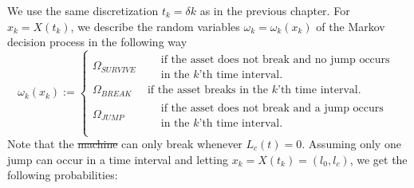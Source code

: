 \documentclass[a4paper]{thesis}
\theoremstyle{definition}
\providecommand{\DIFaddtex}[1]{{\protect\color{blue}\uwave{#1}}} %
\providecommand{\DIFdeltex}[1]{{\protect\color{red}\sout{#1}}}                      %
\providecommand{\DIFaddbegin}{} %
\providecommand{\DIFaddend}{} %
\providecommand{\DIFdelbegin}{} %
\providecommand{\DIFdelend}{} %
\providecommand{\DIFadd}[1]{\texorpdfstring{\DIFaddtex{#1}}{#1}} %
\providecommand{\DIFdel}[1]{\texorpdfstring{\DIFdeltex{#1}}{}} %
\newcommand{\DIFscaledelfig}{0.5}
\newlength{\DIFdelgraphicswidth} %
\newlength{\DIFdelgraphicsheight} %
\newcommand{\DIFaddincludegraphics}[2][]{{\color{blue}\fbox{\DIFOincludegraphics[#1]{#2}}}} %
\newcommand{\DIFdelincludegraphics}[2][]{%
	\sbox{\DIFdelgraphicsbox}{\DIFOincludegraphics[#1]{#2}}%
	\settoboxwidth{\DIFdelgraphicswidth}{\DIFdelgraphicsbox} %
	\settoboxtotalheight{\DIFdelgraphicsheight}{\DIFdelgraphicsbox} %
	\scalebox{\DIFscaledelfig}{%
		\parbox[b]{\DIFdelgraphicswidth}{\usebox{\DIFdelgraphicsbox}\\[-\baselineskip] \rule{\DIFdelgraphicswidth}{0em}}\llap{\resizebox{\DIFdelgraphicswidth}{\DIFdelgraphicsheight}{%
				\setlength{\unitlength}{\DIFdelgraphicswidth}%
				\begin{picture}(1,1)%
				\thicklines\linethickness{2pt} %
				{\color[rgb]{1,0,0}\put(0,0){\framebox(1,1){}}}%
				{\color[rgb]{1,0,0}\put(0,0){\line( 1,1){1}}}%
				{\color[rgb]{1,0,0}\put(0,1){\line(1,-1){1}}}%
				\end{picture}%
			}\hspace*{3pt}}} %
} %
\DeclareRobustCommand{\DIFaddbegin}{\DIFOaddbegin \let\includegraphics\DIFaddincludegraphics} %
\DeclareRobustCommand{\DIFaddend}{\DIFOaddend \let\includegraphics\DIFOincludegraphics} %
\DeclareRobustCommand{\DIFdelbegin}{\DIFOdelbegin \let\includegraphics\DIFdelincludegraphics} %
\DeclareRobustCommand{\DIFdelend}{\DIFOaddend \let\includegraphics\DIFOincludegraphics} %
\begin{document}
	We use the same discretization $t_k=\delta k$ as in the previous chapter.
	For $x_k=X(t_k)$, we describe the random variables $\omega_k=\omega_k(x_k)$ of the Markov decision process in the following way
	\[
	\omega_k(x_k):=\DIFdelbegin %
	\DIFdelend \DIFaddbegin \begin{cases}
	\Omega_{SURVIVE}&\ \begin{split}&\text{if the asset does not break and no jump occurs}\\
	&\text{in the $k$'th time interval.}\end{split}\\
	\Omega_{BREAK}&\ \text{if the asset breaks in the $k$'th time interval.}\\
	\Omega_{JUMP}&\ \begin{split}&\text{if the asset does not break and a jump occurs}\\
	&\text{in the $k$'th time interval.}\end{split}\\
	\end{cases}
	\DIFaddend \]
	Note that the \DIFdelbegin \DIFdel{machine }\DIFdelend \DIFaddbegin \DIFadd{asset }\DIFaddend can only break whenever $L_c(t)=0$.
	Assuming only one jump can occur in a time interval and letting $x_k=X(t_k)=(l_0,l_c)$, we get the following probabilities:
\end{document}
